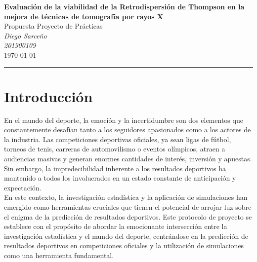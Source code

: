 \begin{titlepage}
\textcolor{DS_Black}{
\begin{minipage}{0.85\textwidth}
    \begin{center}
        \textbf{\Large Evaluación de la viabilidad de la Retrodispersión de Thompson en la mejora de técnicas de tomografía por rayos X}\\
        \vspace{5pt}
        Propuesta Proyecto de Prácticas \\
        \vspace{20pt}
        \textit{Diego Sarceño} \\
        \vspace{5pt}
        \footnotesize{\textit{201900109}} \\
        \vspace{5pt}
        \today
    \end{center}
\end{minipage}
\vspace{10pt}
\hrule
}


%


\section{Introducción}

En el mundo del deporte, la emoción y la incertidumbre son dos elementos que constantemente desafían tanto a los seguidores apasionados como a los actores de la industria. Las competiciones deportivas oficiales, ya sean ligas de fútbol, torneos de tenis, carreras de automovilismo o eventos olímpicos, atraen a audiencias masivas y generan enormes cantidades de interés, inversión y apuestas. Sin embargo, la impredecibilidad inherente a los resultados deportivos ha mantenido a todos los involucrados en un estado constante de anticipación y expectación. \\

En este contexto, la investigación estadística y la aplicación de simulaciones han emergido como herramientas cruciales que tienen el potencial de arrojar luz sobre el enigma de la predicción de resultados deportivos. Este protocolo de proyecto se establece con el propósito de abordar la emocionante intersección entre la investigación estadística y el mundo del deporte, centrándose en la predicción de resultados deportivos en competiciones oficiales y la utilización de simulaciones como una herramienta fundamental. \\



\end{titlepage}
